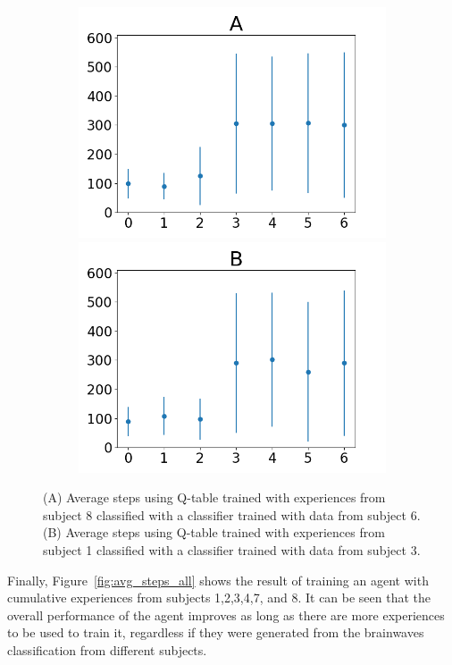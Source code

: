 \documentclass[journal]{IEEEtran}
\begin{document}
{{\begin{figure}[h!]
\begin{subfigure}{0.5\textwidth}
\includegraphics[scale=0.27]{Images/Average_steps/Ax.png}
\includegraphics[scale=0.27]{Images/Average_steps/Bx.png}
\end{subfigure}
\caption{(A) Average steps using Q-table trained with experiences from subject 8 classified with a classifier trained with data from subject 6.  (B) Average steps using Q-table trained with experiences from subject 1 classified with a classifier trained with data from subject 3.}
\label{fig:transferlearning}
\end{figure}

Finally, Figure~\ref{fig:avg_steps_all} shows the result of training an agent with cumulative experiences from subjects 1,2,3,4,7, and 8.  It can be seen that the overall performance of the agent improves as long as there are more experiences to be used to train it, regardless if they were generated from the brainwaves classification from different subjects.  


}}
\end{document}

